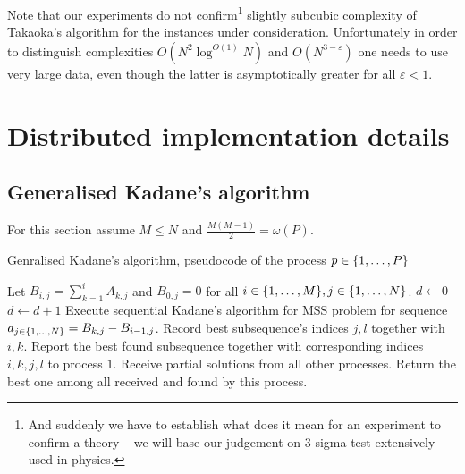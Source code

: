 Note that our experiments do not confirm\footnote{And suddenly we have to establish what does it mean for an experiment to confirm a theory -- we will base our judgement on $3$-sigma test extensively used in physics.} slightly subcubic complexity of Takaoka's algorithm for the instances under consideration.
Unfortunately in order to distinguish complexities $O(N^2 \log^{O(1)}{N})$ and $O(N^{3 - \varepsilon})$ one needs to use very large data, even though the latter is asymptotically greater for all $\varepsilon < 1$.

\section*{Distributed implementation details}

\subsection*{Generalised Kadane's algorithm}

For this section assume $M \leq N$ and $\frac{M (M - 1)}{2} = \omega(P)$.

\begin{algorithm}[h]
    \caption{Genralised Kadane's algorithm, pseudocode of the process $p \in \{ 1, \dots, P \}$}
    \begin{algorithmic}[1]
        \State Let $B_{i, j} = \sum_{k = 1}^{i}{A_{k, j}}$ and $B_{0, j} = 0$ for all $i \in \{ 1, \dots, M \}, j \in \{ 1, \dots, N \}$. \label{alg1-column-prefixes}
        \State $d \gets 0$
                \State $d \gets d + 1$
                    \State Execute sequential Kadane's algorithm for MSS problem for sequence $a_{j \in \{ 1, \dots, N \}} = B_{k, j} - B_{i-1, j}$.
                    \State Record best subsequence's indices $j, l$ together with $i, k$.
                \EndIf
            \EndFor
        \EndFor
            \State Report the best found subsequence together with corresponding indices $i, k, j, l$ to process $1$.
        \Else
            \State Receive partial solutions from all other processes.
            \State Return the best one among all received and found by this process.
        \EndIf
    \end{algorithmic}
\end{algorithm}

